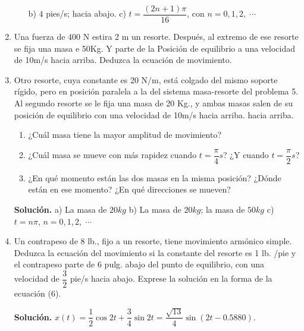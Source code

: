 \documentclass[letterpaper,10pt]{memoir}
\begin{document}
\begin{enumerate}
\begin{enumerate}
\begin{flushright}
					b) \hspace{5mm}\(4\) pies/s; hacia abajo.
					c) \hspace{5mm}\(t= \dfrac{(2n+1) \pi}{16}\), con \(n=0,1,2, \;\cdots\;\)
				\end{flushright}
		\end{enumerate}
	\item Una fuerza de 400 N estira 2 m un resorte. Después, al extremo de ese resorte se fija una masa e 50Kg. Y parte de la Posición de equilibrio a una velocidad de 10m/s hacia arriba. Deduzca la ecuación de movimiento.
	\item Otro resorte, cuya constante es 20 N/m, está colgado del mismo soporte rígido, pero en posición paralela a la del sistema masa-resorte del problema 5. Al segundo resorte se le fija una masa de 20 Kg., y ambas masas salen de su posición de equilibrio con una velocidad de 10m/s hacia arriba. hacia arriba.
		\begin{enumerate}
			\item ¿Cuál masa tiene la mayor amplitud de movimiento?
			\item ¿Cuál masa se mueve con más rapidez cuando \(t= \dfrac{\pi}{4} s\)? ¿Y cuando \(t= \dfrac{\pi}{2} s\)?
			\item ¿En qué momento están las dos masas en la misma posición? ¿Dónde están en ese momento? ¿En qué direcciones se mueven?
		\end{enumerate}
		\begin{flushright}
			\textbf{Solución.} a) La masa de \(20kg\) b) La masa de \(20kg\); la masa de \(50kg\) c) \(t=n \pi\), \(n=0,1,2, \;\cdots\;\)
		\end{flushright}
	\item Un contrapeso de 8 lb., fijo a un resorte, tiene movimiento armónico simple. Deduzca la ecuación del movimiento si la constante del resorte es 1 lb. /pie y el contrapeso parte de 6 pulg. abajo del punto de equilibrio, con una velocidad de \(\dfrac{3}{2}\) pie/s hacia abajo. Exprese la solución en la forma de la ecuación (6).
		\begin{flushright}
			\textbf{Solución.} \(x(t) = \dfrac{1}{2} \cos 2t+ \dfrac{3}{4} \sin 2t= \dfrac{\sqrt{13}}{4} \sin (2t-0.5880)\).
		\end{flushright}
\end{enumerate}
\end{document}
